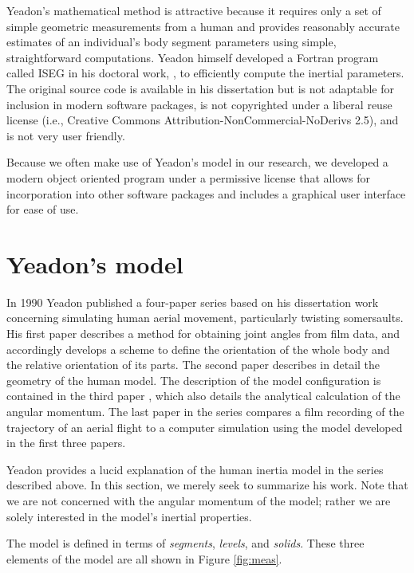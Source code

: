\documentclass[10pt,a4paper,twocolumn]{article}
\begin{document}
Yeadon's mathematical method \cite{Yeadon1990c} is attractive because it
requires only a set of simple geometric measurements from a human and provides
reasonably accurate estimates of an individual's body segment parameters using
simple, straightforward computations. Yeadon himself developed a Fortran
program called ISEG in his doctoral work, \cite{Yeadon1984a}, to efficiently
compute the inertial parameters. The original source code is available in his
dissertation but is not adaptable for inclusion in modern software packages, is
not copyrighted under a liberal reuse license (i.e., Creative Commons
Attribution-NonCommercial-NoDerivs 2.5), and is not very user friendly.

Because we often make use of Yeadon's model in our research, we developed a
modern object oriented program under a permissive license that allows for
incorporation into other software packages and includes a graphical user
interface for ease of use.

\section*{Yeadon's model}

In 1990 Yeadon published a four-paper series based on his dissertation work
concerning simulating human aerial movement, particularly twisting somersaults.
His first paper \cite{Yeadon1990c} describes a method for obtaining joint
angles from film data, and accordingly develops a scheme to define the
orientation of the whole body and the relative orientation of its parts. The
second paper \cite{Yeadon1990f} describes in detail the geometry of the human
model.  The description of the model configuration is contained in the third
paper \cite{Yeadon1990e}, which also details the analytical calculation of the
angular momentum. The last paper in the series \cite{Yeadon1990d} compares a
film recording of the trajectory of an aerial flight to a computer simulation
using the model developed in the first three papers.

Yeadon provides a lucid explanation of the human inertia model in the series
described above. In this section, we merely seek to summarize his work. Note
that we are not concerned with the angular momentum of the model; rather we are
solely interested in the model's inertial properties.

The model is defined in terms of \emph{segments}, \emph{levels}, and
\emph{solids}. These three elements of the model are all shown in Figure
\ref{fig:meas}.
\end{document}
